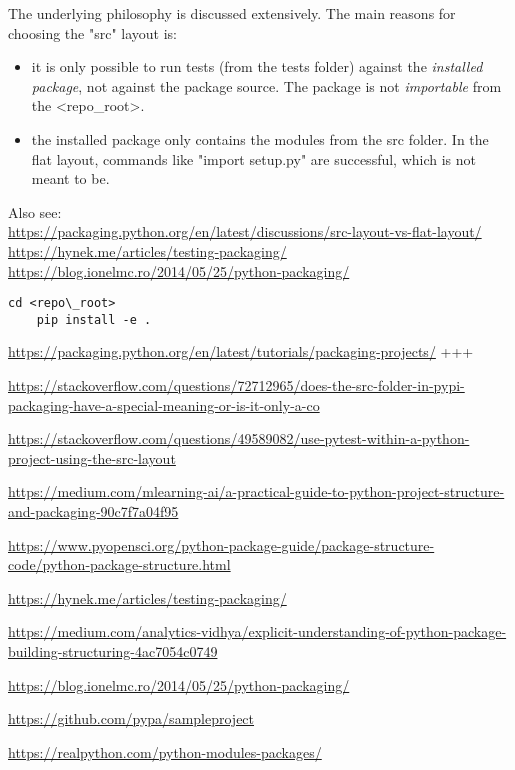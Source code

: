 The underlying philosophy is discussed extensively. The main reasons for choosing the "src" layout is:
\begin{itemize}
	\item it is only possible to run tests (from the \textsf{tests} folder) against the \emph{installed package}, not against the package source. The package is not \emph{importable} from the \textless repo\_root\textgreater.
	\item the installed package only contains the modules from the \textsf{src} folder. In the flat layout, commands like "\textsf{import setup.py}" are successful, which is not meant to be.
\end{itemize}
Also see: \\
\url{https://packaging.python.org/en/latest/discussions/src-layout-vs-flat-layout/} \\
\url{https://hynek.me/articles/testing-packaging/} \\
\url{https://blog.ionelmc.ro/2014/05/25/python-packaging/} \\


\begin{lstlisting}[style=DOS]
	cd <repo\_root>
	pip install -e .
\end{lstlisting}


\newpage

\url{https://packaging.python.org/en/latest/tutorials/packaging-projects/} +++

\url{https://stackoverflow.com/questions/72712965/does-the-src-folder-in-pypi-packaging-have-a-special-meaning-or-is-it-only-a-co}

\url{https://stackoverflow.com/questions/49589082/use-pytest-within-a-python-project-using-the-src-layout}

\url{https://medium.com/mlearning-ai/a-practical-guide-to-python-project-structure-and-packaging-90c7f7a04f95}

\url{https://www.pyopensci.org/python-package-guide/package-structure-code/python-package-structure.html}

\url{https://hynek.me/articles/testing-packaging/}

\url{https://medium.com/analytics-vidhya/explicit-understanding-of-python-package-building-structuring-4ac7054c0749}

\url{https://blog.ionelmc.ro/2014/05/25/python-packaging/}

\url{https://github.com/pypa/sampleproject}

\url{https://realpython.com/python-modules-packages/}

